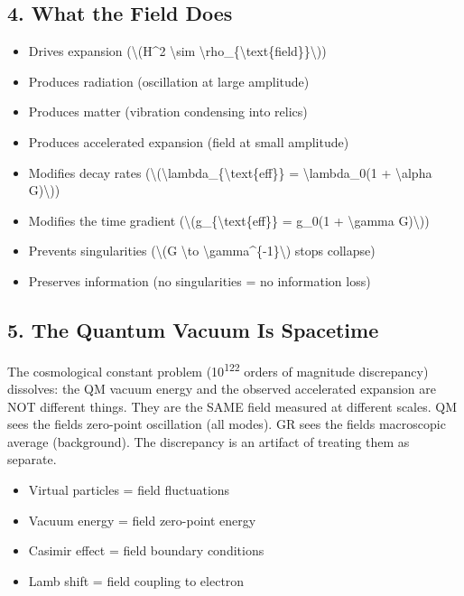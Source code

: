 \documentclass[
  10pt,
]{article}
\providecommand{\tightlist}{%
  \setlength{\itemsep}{0pt}\setlength{\parskip}{0pt}}
\begin{document}
\hypertarget{what-the-field-does}{%
\subsection{4. What the Field Does}\label{what-the-field-does}}

\begin{itemize}
\tightlist
\item
  Drives expansion (\textbackslash(H\^{}2 \textbackslash sim
  \textbackslash rho\_\{\textbackslash text\{field\}\}\textbackslash))
\item
  Produces radiation (oscillation at large amplitude)
\item
  Produces matter (vibration condensing into relics)
\item
  Produces accelerated expansion (field at small amplitude)
\item
  Modifies decay rates
  (\textbackslash(\textbackslash lambda\_\{\textbackslash text\{eff\}\}
  = \textbackslash lambda\_0(1 + \textbackslash alpha G)\textbackslash))
\item
  Modifies the time gradient
  (\textbackslash(g\_\{\textbackslash text\{eff\}\} = g\_0(1 +
  \textbackslash gamma G)\textbackslash))
\item
  Prevents singularities (\textbackslash(G \textbackslash to
  \textbackslash gamma\^{}\{-1\}\textbackslash) stops collapse)
\item
  Preserves information (no singularities = no information loss)
\end{itemize}

\hypertarget{the-quantum-vacuum-is-spacetime}{%
\subsection{5. The Quantum Vacuum Is
Spacetime}\label{the-quantum-vacuum-is-spacetime}}

The cosmological constant problem (10\textsuperscript{122} orders of
magnitude discrepancy) dissolves: the QM vacuum energy and the observed
accelerated expansion are NOT different things. They are the SAME field
measured at different scales. QM sees the field\textquotesingle s
zero-point oscillation (all modes). GR sees the field\textquotesingle s
macroscopic average (background). The discrepancy is an artifact of
treating them as separate.

\begin{itemize}
\tightlist
\item
  Virtual particles = field fluctuations
\item
  Vacuum energy = field zero-point energy
\item
  Casimir effect = field boundary conditions
\item
  Lamb shift = field coupling to electron
\end{itemize}
\end{document}
